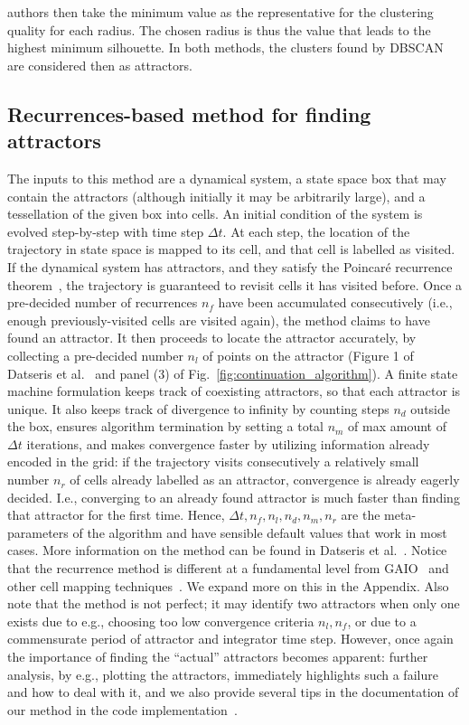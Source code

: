 \documentclass[%
 aip,
 amsmath,amssymb,
 reprint,%
]{revtex4-1}
\begin{document}
authors then take the minimum value as the representative for the clustering quality for each radius. The chosen radius is thus the value that leads to the highest minimum silhouette. In both methods, the clusters found by DBSCAN are considered then as attractors. 


\subsection{Recurrences-based method for finding attractors}
\label{mat:recurrences_summary}
The inputs to this method are a dynamical system, a state space box that may contain the attractors (although initially it may be arbitrarily large), and a tessellation of the given box into cells. An initial condition of the system is evolved step-by-step with time step $\Delta t$. At each step, the location of the trajectory in state space is mapped to its cell, and that cell is labelled as visited. If the dynamical system has attractors, and they satisfy the Poincar\'e recurrence theorem~\cite[Chap. 9]{DatserisBook}, the trajectory is guaranteed to revisit cells it has visited before. Once a pre-decided number of recurrences $n_f$ have been accumulated consecutively (i.e., enough previously-visited cells are visited again), the method claims to have found an attractor. It then proceeds to locate the attractor accurately, by collecting a pre-decided number $n_l$ of points on the attractor (Figure 1 of Datseris et al.~\cite{DatserisWagemakers2022} and panel (3) of Fig.~\ref{fig:continuation_algorithm}). A finite state machine formulation keeps track of coexisting attractors, so that each attractor is unique. It also keeps track of divergence to infinity by counting steps $n_d$ outside the box, ensures algorithm termination by setting a total $n_m$ of max amount of $\Delta t$ iterations, and makes convergence faster by utilizing information already encoded in the grid: if the trajectory visits consecutively a relatively small number $n_r$ of cells already labelled as an attractor, convergence is already eagerly decided. I.e., converging to an already found attractor is much faster than finding that attractor for the first time. Hence, $\Delta t, n_f, n_l, n_d, n_m, n_r$ are the meta-parameters of the algorithm and have sensible default values that work in most cases. More information on the method can be found in Datseris et al.~\cite{DatserisWagemakers2022}. Notice that the recurrence method is different at a fundamental level from GAIO~\cite{gerlach2020set} and other cell mapping techniques~\cite{sun2018cell}. We expand more on this in the Appendix. Also note that the method is not perfect; it may identify two attractors when only one exists due to e.g., choosing too low convergence criteria $n_l, n_f$, or due to a commensurate period of attractor and integrator time step. However, once again the importance of finding the ``actual'' attractors becomes apparent: further analysis, by e.g., plotting the attractors, immediately highlights such a failure and how to deal with it, and we also provide several tips in the documentation of our method in the code implementation~\cite{Attractors.jl}.
\end{document}
